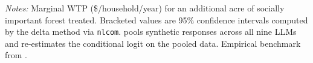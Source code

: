 \begin{table}[h]
\begin{threeparttable}
\begin{tabularx}{\textwidth}{l XXXX}
\bottomrule
\end{tabularx}
\begin{tablenotes}\footnotesize
\item \textit{Notes:} Marginal WTP (\$/household/year) for an additional acre of socially important forest treated. 
Bracketed values are 95\% confidence intervals computed by the delta method via \texttt{nlcom}. 
 pools synthetic responses across all nine LLMs and re-estimates the conditional logit on the pooled data. 
Empirical benchmark from \textcite{Giguere2020}.
\end{tablenotes}
\end{threeparttable}
\end{table}

